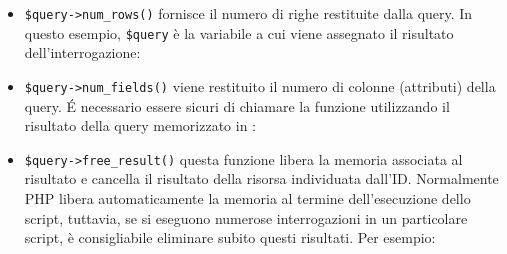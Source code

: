 \begin{itemize}
\item \verb|$query->num_rows()| fornisce il numero di righe restituite dalla query. In questo esempio, \verb|$query| è la variabile a cui viene assegnato il risultato dell'interrogazione:


\item \verb|$query->num_fields()| viene restituito il numero di colonne (attributi) della query. \'E necessario essere sicuri di chiamare la funzione utilizzando il risultato della query memorizzato in :


\item \verb|$query->free_result()| questa funzione libera la memoria associata al risultato e cancella il risultato della risorsa individuata dall'ID. Normalmente \ac{PHP} libera automaticamente la memoria al termine dell'esecuzione dello script, tuttavia, se si eseguono numerose interrogazioni in un particolare script, è consigliabile eliminare subito questi risultati. Per esempio:

\end{itemize}

